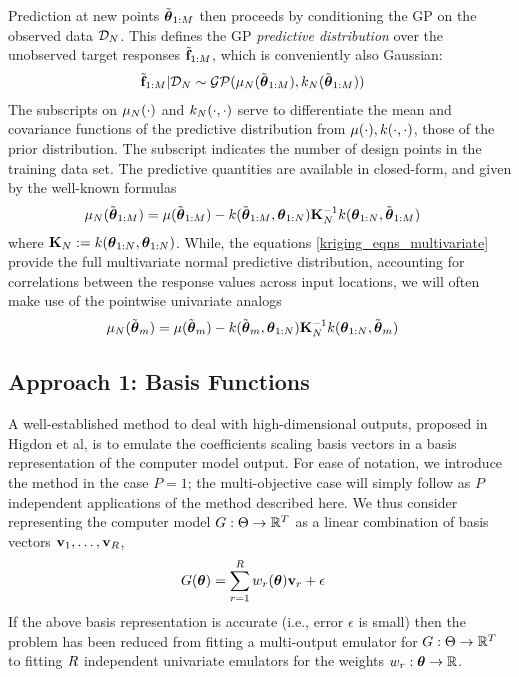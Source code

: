 \documentclass[12pt]{article}
\begin{document}
Prediction at new points $\tilde{\boldsymbol{\theta}}_{1:M}$ then proceeds by conditioning the GP on the observed data $\mathcal{D}_{N}$. This defines the 
GP \textit{predictive distribution} over the unobserved target responses $\tilde{\mathbf{f}}_{1:M}$, which is conveniently also Gaussian:
\begin{align}
\tilde{\mathbf{f}}_{1:M} | \mathcal{D}_{N} &\sim \mathcal{GP}(\mu_{N}(\tilde{\boldsymbol{\theta}}_{1:M}), k_{N}(\tilde{\boldsymbol{\theta}}_{1:M}))
\end{align}
The subscripts on $\mu_{N}(\cdot)$ and $k_{N}(\cdot, \cdot)$ serve to differentiate the mean and covariance functions of the predictive 
distribution from $\mu(\cdot), k(\cdot, \cdot)$, those of the prior distribution. The subscript indicates the number of design points in the training data set. 
The predictive quantities are available in closed-form, and given by the well-known formulas 
\begin{align}
\mu_{N}(\tilde{\boldsymbol{\theta}}_{1:M}) &= \mu(\tilde{\boldsymbol{\theta}}_{1:M}) - k(\tilde{\boldsymbol{\theta}}_{1:M}, \boldsymbol{\theta}_{1:N}) \mathbf{K}_{N}^{-1} k(\boldsymbol{\theta}_{1:N}, \tilde{\boldsymbol{\theta}}_{1:M}) \label{kriging_eqns_multivariate}
\end{align}
where $\mathbf{K}_{N} := k(\boldsymbol{\theta}_{1:N}, \boldsymbol{\theta}_{1:N})$. While, the equations \ref{kriging_eqns_multivariate} provide the full multivariate normal 
predictive distribution, accounting for correlations between the response values across input locations, we will often make use of the pointwise univariate analogs
 \begin{align}
\mu_{N}(\tilde{\boldsymbol{\theta}}_m) &= \mu(\tilde{\boldsymbol{\theta}}_{m}) - k(\tilde{\boldsymbol{\theta}}_{m}, \boldsymbol{\theta}_{1:N}) \mathbf{K}_{N}^{-1} k(\boldsymbol{\theta}_{1:N}, \tilde{\boldsymbol{\theta}}_{m}) \label{kriging_eqns}
\end{align}

\subsection{Approach 1: Basis Functions}
A well-established method to deal with high-dimensional outputs, proposed in Higdon et al, is to emulate the coefficients scaling basis vectors in a basis 
representation of the computer model output. For ease of notation, we introduce the method in the case $P = 1$; the multi-objective case will simply follow 
as $P$ independent applications of the method described here. We thus consider representing the computer model $G: \Theta \to \mathbb{R}^{T}$ as a linear 
combination of basis vectors $\mathbf{v}_1, \dots, \mathbf{v}_{R}$,
\begin{align}
G(\boldsymbol{\theta}) &= \sum_{r = 1}^{R} w_{r}(\boldsymbol{\theta}) \mathbf{v} _{r} + \epsilon \label{basis_representation}
\end{align}
If the above basis representation is accurate (i.e., error $\epsilon$ is small) then the problem has been reduced from fitting a multi-output emulator for
$G: \Theta \to \mathbb{R}^{T}$ to fitting $R$ independent univariate emulators for the weights $w_{r}: \boldsymbol{\theta} \to \mathbb{R}$. 
\end{document}
